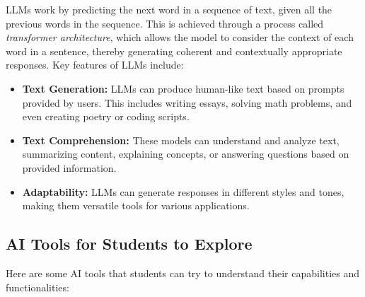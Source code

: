 \documentclass{article}
\begin{document}
LLMs work by predicting the next word in a sequence of text, given all the previous words in the sequence. This is achieved through a process called \textit{transformer architecture}, which allows the model to consider the context of each word in a sentence, thereby generating coherent and contextually appropriate responses. Key features of LLMs include:
\begin{itemize}
    \item \textbf{Text Generation:} LLMs can produce human-like text based on prompts provided by users. This includes writing essays, solving math problems, and even creating poetry or coding scripts.
    \item \textbf{Text Comprehension:} These models can understand and analyze text, summarizing content, explaining concepts, or answering questions based on provided information.
    \item \textbf{Adaptability:} LLMs can generate responses in different styles and tones, making them versatile tools for various applications.
\end{itemize}

\subsection{AI Tools for Students to Explore}

Here are some AI tools that students can try to understand their capabilities and functionalities:
\end{document}
